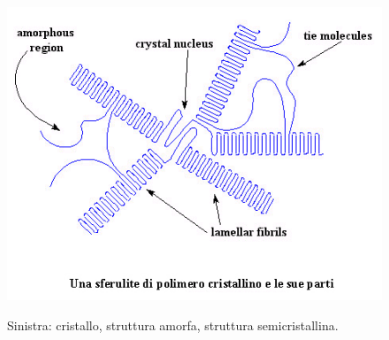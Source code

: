 \begin{figure}[h]
\begin{minipage}[b]{0.3\linewidth}
  \end{minipage}
    \begin{minipage}[b]{0.3\linewidth}
    \centering
    \includegraphics[width=\linewidth]{struttura/polimero,semicristallino.jpg}
    \label{semi}  

  \end{minipage}

  \caption{Sinistra: cristallo, struttura amorfa, struttura semicristallina.}
  
\end{figure}


